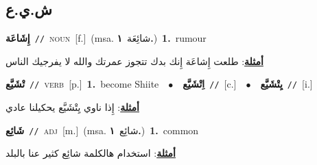 \documentclass[10pt,a4paper,twoside]{article} %
\begin{document}
\begin{multicols}{2}
\vspace{-3mm}
\subsection*{\color{blue}\foreignlanguage{arabic}{ش.ي.ع}\color{blue}{}} 

{\setlength\topsep{0pt}\textbf{\foreignlanguage{arabic}{إِشَاعَة}}\ {\color{gray}\texttt{//}\color{black}}\ \textsc{noun}\ [f.]\ \color{gray}(msa. \foreignlanguage{arabic}{شائِعَة}~\foreignlanguage{arabic}{\textbf{١.}})\color{black}\ \textbf{1.}~rumour\  \begin{flushright}\color{gray}\foreignlanguage{arabic}{\textbf{\underline{\foreignlanguage{arabic}{أمثلة}}}: طلعت إِشاعَة إِنك بدك تتجوز عمرتك والله لا يفرجيك الناس}\end{flushright}\color{black}} \vspace{2mm}

{\setlength\topsep{0pt}\textbf{\foreignlanguage{arabic}{تْشَيَّع}}\ {\color{gray}\texttt{//}\color{black}}\ \textsc{verb}\ [p.]\ \textbf{1.}~become Shiite\ \ $\bullet$\ \ \setlength\topsep{0pt}\textbf{\foreignlanguage{arabic}{اِتْشَيَّع}}\ {\color{gray}\texttt{//}\color{black}}\ [c.]\ \ $\bullet$\ \ \setlength\topsep{0pt}\textbf{\foreignlanguage{arabic}{يِتْشَيَّع}}\ {\color{gray}\texttt{//}\color{black}}\ [i.]\  \begin{flushright}\color{gray}\foreignlanguage{arabic}{\textbf{\underline{\foreignlanguage{arabic}{أمثلة}}}: إِذا ناوي يِتْشَيَّع يحكيلنا عادي}\end{flushright}\color{black}} \vspace{2mm}

{\setlength\topsep{0pt}\textbf{\foreignlanguage{arabic}{شَائِع}}\ {\color{gray}\texttt{//}\color{black}}\ \textsc{adj}\ [m.]\ \color{gray}(msa. \foreignlanguage{arabic}{شائِع}~\foreignlanguage{arabic}{\textbf{١.}})\color{black}\ \textbf{1.}~common\  \begin{flushright}\color{gray}\foreignlanguage{arabic}{\textbf{\underline{\foreignlanguage{arabic}{أمثلة}}}: استخدام هالكلمة شائِع كثير عنا بالبلد}\end{flushright}\color{black}} \vspace{2mm}


\end{multicols}
\end{document}
